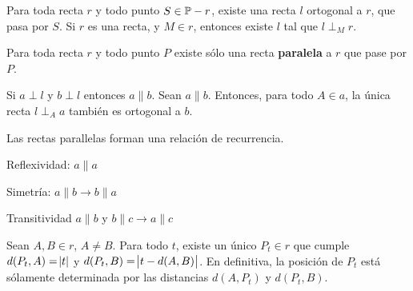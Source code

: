  Para toda recta $r$ y todo punto $S \in \P - r$, existe una recta $l$ ortogonal a $r$, que pasa por $S$. Si $r$ es una recta, y $M \in r$, entonces existe $l$ tal que $l \perp_M r$.

 Para toda recta $r$ y todo punto $P$ existe sólo una recta \textbf{paralela} a $r$ que pase por $P$.

 Si $a \perp l$ y $b \perp l$ entonces $a \parallel b$. Sean $a \parallel b$. Entonces, para todo $A \in a$, la única recta $l \perp_A a$ también es ortogonal a $b$.

 Las rectas parallelas forman una relación de recurrencia.
\begin{itemizex}
	\item Reflexividad: $a\parallel a$
	\item Simetría: $a \parallel b \rightarrow b \parallel a$
	\item Transitividad  $a \parallel b $ y  $b \parallel c \rightarrow a \parallel c$
\end{itemizex}

 Sean $A,B \in r$, $A \neq B$. Para todo $t$, existe un único $P_t\in r$ que cumple $d(P_t,A) = \abs{t}$ y $d(P_t, B) = \abs{t-d(A,B)}$. En definitiva, la posición de $P_t$ está sólamente determinada por las distancias $d(A, P_t)$ y $d(P_t, B)$.
	 
	 
	 
	 
	 
	 
	 